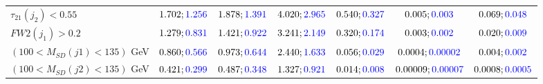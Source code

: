 \begin{landscape}
\begin{table}
\begin{tabular}{lcccccc}
				\rowcolor{black!7}$\tau_{21}(j_2)<0.55$ &$1.702;\textcolor{blue}{1.256}$ &$1.878;\textcolor{blue}{1.391}$ &$4.020;\textcolor{blue}{2.965}$&$0.540;\textcolor{blue}{0.327}$&$0.005;\textcolor{blue}{0.003}$&$0.069;\textcolor{blue}{0.048}$\\
				$FW2(j_1)>0.2$ &$1.279;\textcolor{blue}{0.831}$ &$1.421;\textcolor{blue}{0.922}$&$3.241;\textcolor{blue}{2.149}$&$0.320;\textcolor{blue}{0.174}$&$0.003;\textcolor{blue}{0.002}$&$0.020;\textcolor{blue}{0.009}$\\
				\rowcolor{black!7}$(100<M_{SD}(j1)<135)$ GeV& $0.860;\textcolor{blue}{0.566}$&$0.973;\textcolor{blue}{0.644}$&$2.440;\textcolor{blue}{1.633}$&$0.056;\textcolor{blue}{0.029}$&$0.0004;\textcolor{blue}{0.00002}$&$0.004;\textcolor{blue}{0.002}$\\
				$(100<M_{SD}(j2)<135)$ GeV &$0.421;\textcolor{blue}{0.299}$ &$0.487;\textcolor{blue}{0.348}$ &$1.327;\textcolor{blue}{0.921}$&$0.014;\textcolor{blue}{0.008}$&$0.00009;\textcolor{blue}{0.00007}$&$0.0008;\textcolor{blue}{0.0005}$\\
				\bottomrule
			\end{tabular}
		\end{table}
		

\end{landscape}
